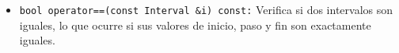 \begin{itemize}

    \item \texttt{bool operator==(const Interval \&i) const:}  
    Verifica si dos intervalos son iguales, lo que ocurre si sus valores de inicio, paso y fin son exactamente iguales.


\end{itemize}
